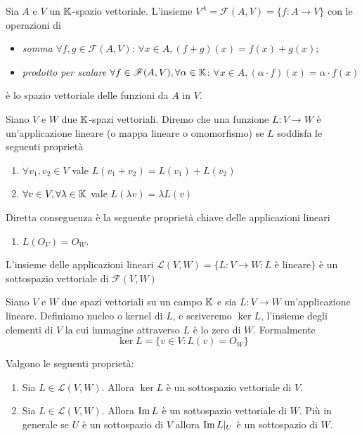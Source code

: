 
\begin{definition}
	Sia $ A $ e $ V $ un $ \mathbb{K} $-spazio vettoriale. L'insieme $ V^A = \mathscr{F}{(A, V)} = \{f \colon A \to V\} $ con le operazioni di
	\begin{itemize}
		\item \emph{somma} $ \forall f, g \in \mathscr{F}(A, V) $: $ \forall x \in A, (f + g)(x) = f(x) + g(x) $;
		\item \emph{prodotto per scalare} $ \forall f \in \mathscr{F}(A, V), \forall \alpha \in \mathbb{K} $: $ \forall x \in A, (\alpha \cdot f)(x) = \alpha \cdot f(x) $
	\end{itemize} 
	è lo spazio vettoriale delle funzioni da $ A $ in $ V $. 
\end{definition}

\begin{definition}
	Siano $ V $ e $ W $ due $ \mathbb{K} $-spazi vettoriali. Diremo che una funzione $ L \colon V \to W  $ è un'applicazione lineare (o mappa lineare o omomorfismo) se $ L $ soddisfa le seguenti proprietà
	\begin{enumerate}[label = (\roman*)]
		\item $ \forall v_1, v_2 \in V $ vale $ L(v_1 + v_2) = L(v_1) + L(v_2) $
		\item $ \forall v \in V, \forall \lambda \in \mathbb{K} $ vale $ L(\lambda v) = \lambda L(v)$
	\end{enumerate}
	Diretta conseguenza è la seguente proprietà chiave delle applicazioni lineari
	\begin{enumerate}[resume, label = (\roman*)]
		\item $ L(O_V) = O_W $.
	\end{enumerate}
	L'insieme delle applicazioni lineari $ \mathscr{L}{(V, W)} = \{L \colon V \to W : L \text{ è lineare}\} $ è un sottospazio vettoriale di $ \mathscr{F}{(V, W)} $
\end{definition}

\begin{definition}[Nucleo]
	Siano $ V $ e $ W $ due spazi vettoriali su un campo $ \mathbb{K} $ e sia $ L \colon V \to W  $ un'applicazione lineare. Definiamo nucleo o kernel di $ L $, e scriveremo $ \ker{L}$, l'insieme degli elementi di $ V $ la cui immagine attraverso $ L $ è lo zero di $ W $. Formalmente \[\ker{L} = \{v \in V \colon L(v) = O_W\} \]
\end{definition}

\begin{prop}
	Valgono le seguenti proprietà:
	\begin{enumerate}[label = (\roman*)]
		\item Sia $ L \in \mathscr{L}{(V, W)} $. Allora $ \ker{L} $ è un sottospazio vettoriale di $ V $.
		\item Sia $ L \in \mathscr{L}{(V, W)} $. Allora $ \operatorname{Im}{L} $ è un sottospazio vettoriale di $ W $.
			Più in generale se $U$ è un sottospazio di $V$ allora $ \operatorname{Im}{L|_U} $ è un sottospazio di $W$.
	\end{enumerate}
\end{prop}

